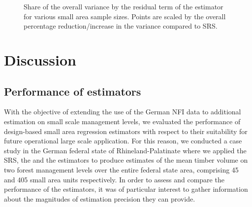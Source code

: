 \begin{figure}[H]
	\centering
	\caption{Share of the overall variance by the residual term of the \psmall{} estimator for various small area sample sizes. Points are scaled by the overall percentage reduction/increase in the variance compared to SRS.}
	\label{fig:fail}
\end{figure}



\section{Discussion}
\label{sec:Dis}

\subsection{Performance of estimators}

With the objective of extending the use of the German NFI data to additional estimation on small scale management levels, we evaluated the performance of design-based small area regression estimators with respect to their suitability for future operational large scale application. For this reason, we conducted a case study in the German federal state of Rhineland-Palatinate where we applied the SRS, the \psmall{} and the \extpsynth{} estimators to produce estimates of the mean timber volume on two forest management levels over the entire federal state area, comprising 45 and 405 small area units respectively. In order to assess and compare the performance of the estimators, it was of particular interest to gather information about the magnitudes of estimation precision they can provide.\par

